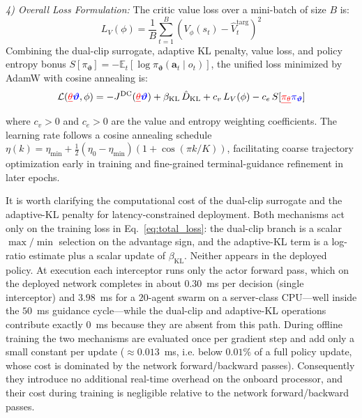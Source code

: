 \documentclass[lettersize,journal]{IEEEtran}
\newcommand{\hladd}[1]{{\color{blue}#1}}
\newcommand{\hldel}[1]{{\color{red}\sout{#1}}}
\begin{document}
\emph{4) Overall Loss Formulation:} The critic value loss over a mini-batch of size $B$ is:
\begin{equation}
\label{eq:value_loss}
L_V(\phi) = \frac{1}{B}\sum_{t=1}^{B} \left(V_\phi(s_t) - \hat{V}_t^{\mathrm{targ}}\right)^2
\end{equation}
Combining the dual-clip surrogate, adaptive KL penalty, value loss, and policy entropy bonus \hladd{$S[\pi_{\boldsymbol{\vartheta}}] = -\mathbb{E}_t[\log\pi_{\boldsymbol{\vartheta}}(\mathbf{a}_t \mid o_t)]$}, the unified loss minimized by AdamW with cosine annealing is:
\begin{equation}
\label{eq:total_loss}
\mathcal{L}(\hldel{\theta}\hladd{\boldsymbol{\vartheta}},\phi) = - J^{\mathrm{DC}}(\hldel{\theta}\hladd{\boldsymbol{\vartheta}}) + \beta_{\mathrm{KL}}\,\hat{D}_{\mathrm{KL}} + c_v\,L_V(\phi) - c_e\,S[\hldel{\pi_\theta}\hladd{\pi_{\boldsymbol{\vartheta}}}]
\end{equation}
where $c_v > 0$ and $c_e > 0$ are the value and entropy weighting coefficients. The learning rate follows a cosine annealing schedule $\eta(k) = \eta_{\min} + \frac{1}{2}(\eta_0 - \eta_{\min})(1 + \cos(\pi k / K))$, facilitating coarse trajectory optimization early in training and fine-grained terminal-guidance refinement in later epochs.

\hladd{It is worth clarifying the computational cost of the dual-clip surrogate and the adaptive-KL
penalty for latency-constrained deployment. Both mechanisms act only on the training loss
in Eq.~\eqref{eq:total_loss}: the dual-clip branch is a scalar $\max/\min$ selection on the
advantage sign, and the adaptive-KL term is a log-ratio estimate plus a scalar update of
$\beta_{\mathrm{KL}}$. Neither appears in the deployed policy. At execution each interceptor runs
only the actor forward pass, which on the deployed network completes in
about $0.30$~ms per decision (single interceptor) and $3.98$~ms for a $20$-agent swarm on a
server-class CPU---well inside the $50$~ms guidance cycle---while the dual-clip and adaptive-KL
operations contribute exactly $0$~ms because they are absent from this path. During offline
training the two mechanisms are evaluated once per gradient step and add only a small constant
per update ($\approx 0.013$~ms, i.e. below $0.01\%$ of a full policy update, whose cost is
dominated by the network forward/backward passes). Consequently they introduce no additional real-time overhead
on the onboard processor, and their cost during training is negligible relative to the network
forward/backward passes.}
\end{document}
